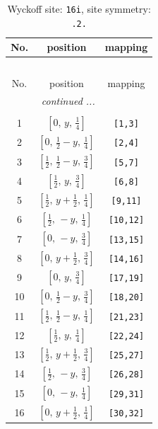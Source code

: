 \documentclass[fleqn,8pt]{jsarticle}
\begin{document}
\renewcommand{\arraystretch}{1.2}
\begin{longtable}{ccc}
\caption{Wyckoff site: {\tt 16i}, site symmetry: {\tt .2.}}
 \\
 \hline \hline
No. & position & mapping \\ \hline \endfirsthead

\multicolumn{2}{l}{\tablename\ \thetable{}} \\
 \hline \hline
No. & position & mapping \\ \hline \endhead

 \hline \hline
\multicolumn{2}{r}{\footnotesize\it continued ...} \\ \endfoot

 \hline \hline
\multicolumn{2}{r}{} \\ \endlastfoot

1 & $\left[ 0,\, y,\, \frac{1}{4} \right]$ & {\tt [1,3]} \\ \hline
2 & $\left[ 0,\, \frac{1}{2} - y,\, \frac{1}{4} \right]$ & {\tt [2,4]} \\ \hline
3 & $\left[ \frac{1}{2},\, \frac{1}{2} - y,\, \frac{3}{4} \right]$ & {\tt [5,7]} \\ \hline
4 & $\left[ \frac{1}{2},\, y,\, \frac{3}{4} \right]$ & {\tt [6,8]} \\ \hline
5 & $\left[ \frac{1}{2},\, y + \frac{1}{2},\, \frac{1}{4} \right]$ & {\tt [9,11]} \\ \hline
6 & $\left[ \frac{1}{2},\, - y,\, \frac{1}{4} \right]$ & {\tt [10,12]} \\ \hline
7 & $\left[ 0,\, - y,\, \frac{3}{4} \right]$ & {\tt [13,15]} \\ \hline
8 & $\left[ 0,\, y + \frac{1}{2},\, \frac{3}{4} \right]$ & {\tt [14,16]} \\ \hline
9 & $\left[ 0,\, y,\, \frac{3}{4} \right]$ & {\tt [17,19]} \\ \hline
10 & $\left[ 0,\, \frac{1}{2} - y,\, \frac{3}{4} \right]$ & {\tt [18,20]} \\ \hline
11 & $\left[ \frac{1}{2},\, \frac{1}{2} - y,\, \frac{1}{4} \right]$ & {\tt [21,23]} \\ \hline
12 & $\left[ \frac{1}{2},\, y,\, \frac{1}{4} \right]$ & {\tt [22,24]} \\ \hline
13 & $\left[ \frac{1}{2},\, y + \frac{1}{2},\, \frac{3}{4} \right]$ & {\tt [25,27]} \\ \hline
14 & $\left[ \frac{1}{2},\, - y,\, \frac{3}{4} \right]$ & {\tt [26,28]} \\ \hline
15 & $\left[ 0,\, - y,\, \frac{1}{4} \right]$ & {\tt [29,31]} \\ \hline
16 & $\left[ 0,\, y + \frac{1}{2},\, \frac{1}{4} \right]$ & {\tt [30,32]} \\
\end{longtable}
\end{document}
